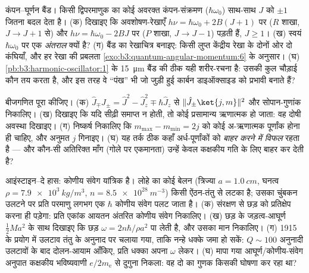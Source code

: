 \begin{exercise}[$\star\star\star$]\label{exo:b3:quantum-angular-momentum:10}
कंपन--घूर्णन बैंड। किसी द्विपरमाणुक का कोई अवरक्त कंपन-संक्रमण
($\hbar\omega_0$) साथ-साथ $J$ को $\pm1$ जितना बदल देता है। (क)
दिखाइए कि अवशोषण-रेखाएँ $h\nu =
\hbar\omega_0 + 2B(J+1)$ पर ($R$ शाखा, $J \to J+1$ से) और
$h\nu = \hbar\omega_0 - 2BJ$ पर ($P$ शाखा, $J \to J-1$) पड़ती हैं, $J \ge
1$। (ख) स्वयं $\hbar\omega_0$ पर एक \emph{अंतराल} क्यों है? (ग)
बैंड का रेखाचित्र बनाइए: किसी लुप्त केंद्रीय रेखा के दोनों ओर दो कंघियाँ,
और हर रेखा की प्रबलता
\cref{exo:b3:quantum-angular-momentum:6} के अनुसार। (घ)
\cref{pb:b3:harmonic-oscillator:1} के \qty{15}{\micro m} बैंड की
ठीक यही शरीर-रचना है: उसकी कुल चौड़ाई कौन तय करता है, और इस तरह वे
``पंख'' भी जो जुड़ी हुई कार्बन डाइऑक्साइड को प्रभावी बनाते हैं?
\end{exercise}

\begin{exercise}[$\star\star\star$]\label{exo:b3:quantum-angular-momentum:11}
बीजगणित पूरा कीजिए। (क) $\hat J_\mp\hat J_\pm = \hat J^2 -
\hat J_z^2 \mp \hbar\hat J_z$ से $\|\hat J_\pm\ket{j,m}\|^2$
और सोपान-गुणांक निकालिए। (ख) दिखाइए कि यदि सीढ़ी समाप्त न होती,
तो कोई प्रसामान्य ऋणात्मक हो जाता: वह दोषी अवस्था दिखाइए।
(ग) निष्कर्ष निकालिए कि $m_{\max} - m_{\min} = 2j$ को कोई अ-ऋणात्मक
पूर्णांक होना ही चाहिए, और अनुमत $j$ गिनाइए। (घ) यह तर्क ठीक कहाँ
अर्ध-पूर्णांकों को \emph{बाहर करने में विफल} रहता है --- और कौन-सी
अतिरिक्त माँग (गोले पर एकमानता) उन्हें केवल कक्षकीय गति के लिए बाहर
कर देती है?
\end{exercise}

\begin{exercise}[$\star\star\star$]\label{exo:b3:quantum-angular-momentum:12}
आइंस्टाइन--दे हास: कोणीय संवेग यांत्रिक है। लोहे का कोई बेलन
(त्रिज्या $a = \qty{1.0}{cm}$, घनत्व $\rho = \qty{7.9e3}{kg/m^3}$,
$n = \qty{8.5e28}{m^{-3}}$) किसी ऐंठन-तंतु से लटका है; उसका
चुंबकन उलटने पर प्रति परमाणु लगभग एक $\hbar$ कोणीय संवेग पलट जाता है।
(क) संरक्षण से छड़ को प्रतिक्षेप करना ही पड़ेगा: प्रति एकांक आयतन
अंतरित कोणीय संवेग निकालिए। (ख) छड़ के जड़त्व-आघूर्ण $\tfrac12 M
a^2$ के साथ दिखाइए कि छड़ $\omega = 2n\hbar/\rho a^2$ पा लेती है, और
उसका मान निकालिए। (ग) 1915 के प्रयोग में उलटाव तंतु के अनुनाद पर
चलाया गया, ताकि नन्हे धक्के जमा हो सकें: $Q \sim 100$ अनुनादी उलटावों
के बाद दोलन-आयाम आँकिए, प्रति धक्का अपना $\omega$ लेकर। (घ)
मापा गया आघूर्ण/कोणीय-संवेग अनुपात कक्षकीय भविष्यवाणी $e/2m_{\text{e}}$
से दुगुना निकला: वह दो का गुणक किसकी घोषणा कर रहा था?
\end{exercise}

